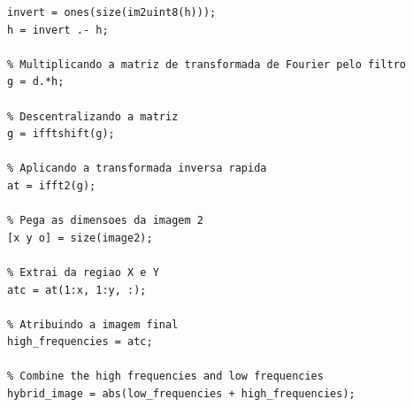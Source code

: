 \begin{lstlisting}[style=Matlab-editor]
% Inverter a transformada
invert = ones(size(im2uint8(h)));
h = invert .- h;

% Multiplicando a matriz de transformada de Fourier pelo filtro
g = d.*h;

% Descentralizando a matriz
g = ifftshift(g);

% Aplicando a transformada inversa rapida
at = ifft2(g);

% Pega as dimensoes da imagem 2
[x y o] = size(image2);

% Extrai da regiao X e Y
atc = at(1:x, 1:y, :);

% Atribuindo a imagem final
high_frequencies = atc;

% Combine the high frequencies and low frequencies
hybrid_image = abs(low_frequencies + high_frequencies);
\end{lstlisting}








